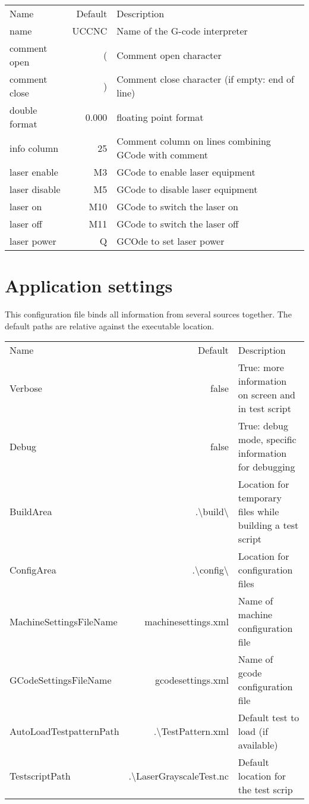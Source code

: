 \begin{tabular}{lrl}
    Name          & Default & Description\\
    name          &   UCCNC & Name of the G-code interpreter\\
    comment open  &       ( & Comment open character\\
    comment close &       ) & Comment close character (if empty: end of line)\\
    double format &   0.000 & floating point format\\
    info column   &      25 & Comment column on lines combining GCode with comment\\
    laser enable  &      M3 & GCode to enable laser equipment\\
    laser disable &      M5 & GCode to disable laser equipment\\
    laser on      &     M10 & GCode to switch the laser on\\
    laser off     &     M11 & GCode to switch the laser off\\
    laser power   &       Q & GCOde to set laser power\\
\end{tabular}

\section{Application settings}
This configuration file binds all information from several sources together. The default paths are relative against the executable location.

\begin{tabular}{lrl}
    Name          & Default & Description\\
    Verbose       & false   & True: more information on screen and in test script\\
    Debug         & false   & True: debug mode, specific information for debugging\\
    BuildArea     & .\textbackslash{}build\textbackslash{} & Location for temporary files while building a test script\\
    ConfigArea    & .\textbackslash{}config\textbackslash{} & Location for configuration files\\
    MachineSettingsFileName & machinesettings.xml & Name of machine configuration file\\
    GCodeSettingsFileName & gcodesettings.xml & Name of gcode configuration file\\
    AutoLoadTestpatternPath & .\textbackslash{}TestPattern.xml & Default test to load (if available)\\
    TestscriptPath & .\textbackslash{}LaserGrayscaleTest.nc & Default location for the test scrip\\
\end{tabular}
